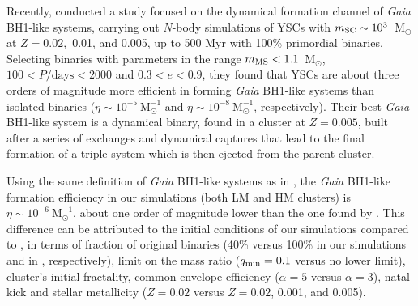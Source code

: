 \documentclass[fleqn,usenatbib]{mnras}
\newcommand{\bh}{\textit{Gaia} BH1}
\begin{document}
Recently, \cite{tanikawa2023} conducted a study focused on the dynamical formation channel of \bh-like systems, carrying out $N$-body simulations of YSCs with $m_{\rm{SC}}\sim10^3$~M$_\odot$ at $Z = 0.02,$ 0.01, and 0.005, up to 500 Myr with 100\% primordial binaries. 
Selecting binaries with parameters in the range $m_{\rm{MS}} <1.1$~M$_\odot$, $100 < P/\mathrm{days}< 2000$ and $0.3 < e < 0.9 $, they found that YSCs are about three orders of magnitude more efficient in forming \bh-like systems than isolated binaries ($\eta\sim10^{-5} \ \mathrm{M}^{-1}_\odot$ and $\eta\sim10^{-8} \ \mathrm{M}^{-1}_\odot$, respectively). Their best \bh{}-like system is a dynamical binary, found in a cluster at $Z=0.005$, built after a series of exchanges and dynamical captures that lead to the final formation 
of a triple system which is then ejected from the parent cluster.


Using the same 
definition of \bh{}-like systems as in \cite{tanikawa2023}, the \bh{}-like formation efficiency in our simulations (both LM and HM clusters) is $\eta\sim10^{-6} \ \mathrm{M}^{-1}_\odot$, about one order of magnitude lower than the one found by  \cite{tanikawa2023}. 
This difference can be attributed to the initial conditions of our simulations compared  to \citet{tanikawa2023}, in terms of fraction of original binaries (40\% versus 100\% in our simulations and in \citealt{tanikawa2023}, respectively), limit on the mass ratio ($q_{\rm{min}}=0.1$ versus no lower limit), cluster's initial fractality, common-envelope efficiency ($\alpha=5$ versus $\alpha=3$), natal kick and stellar metallicity ($Z=0.02$ versus $Z=0.02$, 0.001, and 0.005). 

\end{document}
